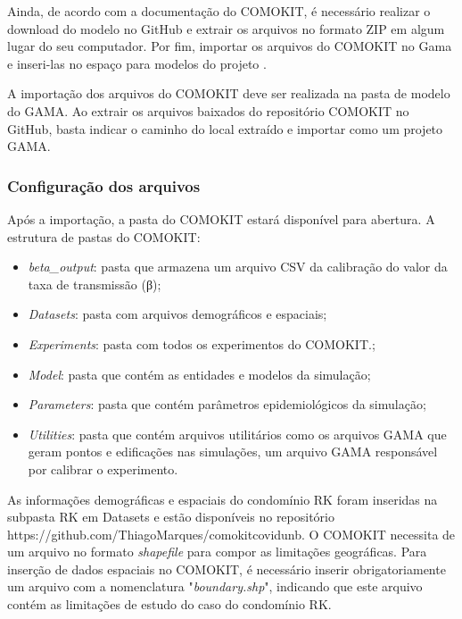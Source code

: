 Ainda, de acordo com a documentação do COMOKIT, é necessário realizar o download do modelo no GitHub e extrair os arquivos no formato ZIP em algum lugar do seu computador. Por fim, importar os arquivos do COMOKIT no Gama e inseri-las no espaço para modelos do projeto \cite{ComokitDoc}.


A importação dos arquivos do COMOKIT deve ser realizada na pasta de modelo do GAMA. Ao extrair os arquivos baixados do repositório COMOKIT no GitHub, basta indicar o caminho do local extraído e importar como um projeto GAMA.


\subsubsection{Configuração dos arquivos}

Após a importação, a pasta do COMOKIT estará disponível para abertura. A estrutura de pastas do COMOKIT:

\begin{itemize}
\item \textit{beta\_output}: pasta que armazena um arquivo CSV da calibração do valor da taxa de transmissão (β);
\item \textit{Datasets}: pasta com arquivos demográficos e espaciais;
\item \textit{Experiments}: pasta com todos os experimentos do COMOKIT.;
\item \textit{Model}: pasta que contém as entidades e modelos da simulação;
\item \textit{Parameters}: pasta que contém parâmetros epidemiológicos da simulação;
\item \textit{Utilities}: pasta que contém arquivos utilitários como os arquivos GAMA que geram pontos e edificações nas simulações, um arquivo GAMA responsável por calibrar o experimento.
\end{itemize}

As informações demográficas e espaciais do condomínio RK foram inseridas na subpasta RK em Datasets e estão disponíveis no repositório https://github.com/ThiagoMarques/comokitcovidunb. O COMOKIT necessita de um arquivo no formato \textit{shapefile} para compor as limitações geográficas. Para inserção de dados espaciais no COMOKIT, é necessário inserir obrigatoriamente um arquivo com a nomenclatura "\textit{boundary.shp}", indicando que este arquivo contém as limitações de estudo do caso do condomínio RK.

